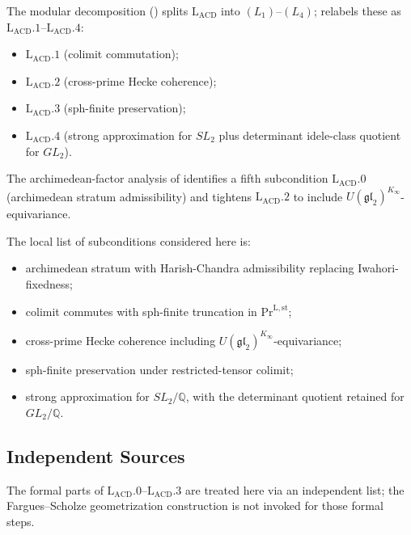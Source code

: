 The modular decomposition ()
splits \(\mathrm{L}_{\mathrm{ACD}}\) into \((L_{1})\)--\((L_{4})\);
 relabels these as
\(\mathrm{L}_{\mathrm{ACD}}.1\)--\(\mathrm{L}_{\mathrm{ACD}}.4\):
\begin{itemize}
\item \(\mathrm{L}_{\mathrm{ACD}}.1\) (colimit commutation);
\item \(\mathrm{L}_{\mathrm{ACD}}.2\) (cross-prime Hecke coherence);
\item \(\mathrm{L}_{\mathrm{ACD}}.3\) (sph-finite preservation);
\item \(\mathrm{L}_{\mathrm{ACD}}.4\) (strong approximation for
\(SL_{2}\) plus determinant idele-class quotient for \(GL_{2}\)).
\end{itemize}
The archimedean-factor analysis of  identifies
a fifth subcondition \(\mathrm{L}_{\mathrm{ACD}}.0\) (archimedean
stratum admissibility) and tightens \(\mathrm{L}_{\mathrm{ACD}}.2\) to
include \(U(\mathfrak{gl}_{2})^{K_{\infty}}\)-equivariance.

The local list of subconditions considered here is:
\begin{itemize}
\item[\(\mathrm{L}_{\mathrm{ACD}}.0\):] archimedean stratum with
Harish-Chandra admissibility replacing Iwahori-fixedness;
\item[\(\mathrm{L}_{\mathrm{ACD}}.1\):] colimit commutes with
sph-finite truncation in \(\mathrm{Pr}^{\mathrm{L,st}}\);
\item[\(\mathrm{L}_{\mathrm{ACD}}.2\):] cross-prime Hecke coherence
including \(U(\mathfrak{gl}_{2})^{K_{\infty}}\)-equivariance;
\item[\(\mathrm{L}_{\mathrm{ACD}}.3\):] sph-finite preservation under
restricted-tensor colimit;
\item[\(\mathrm{L}_{\mathrm{ACD}}.4\):] strong approximation for
\(SL_{2}/\mathbb{Q}\), with the determinant quotient retained for
\(GL_{2}/\mathbb{Q}\).
\end{itemize}

\subsection{Independent Sources}

The formal parts of \(\mathrm{L}_{\mathrm{ACD}}.0\)--\(\mathrm{L}_{\mathrm{ACD}}.3\)
are treated here via an independent list; the Fargues--Scholze
geometrization construction is not invoked for those formal steps.

